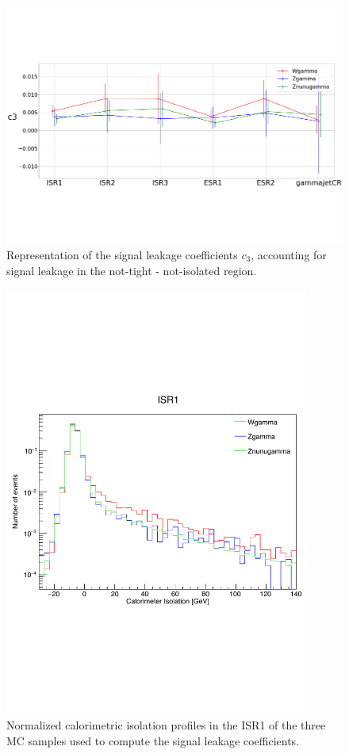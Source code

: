 \documentclass[11pt,a4paper,twoside,openright]{book}
\begin{document}
\begin{figure}[hbtp!]
    \centering
    \includegraphics[width=12cm]{c3.pdf}
    \caption{Representation of the signal leakage coefficients $c_{3}$, accounting for signal leakage in the not-tight - not-isolated region.}
    \label{fig:c3}
\end{figure}





\begin{figure}[hbtp!]
    \centering
    \includegraphics[width=10cm]{c1_isolation_profiles.pdf}
    \caption{Normalized calorimetric isolation profiles in the ISR1 of the three MC samples used to compute the signal leakage coefficients.}
    \label{fig:c1_isolation_profiles}
\end{figure}
\end{document}
